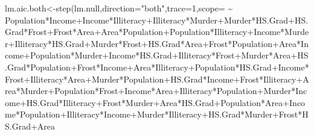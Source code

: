 \documentclass[
]{article}
\newenvironment{Shaded}{\begin{snugshade}}{\end{snugshade}}
\newcommand{\AttributeTok}[1]{\textcolor[rgb]{0.77,0.63,0.00}{#1}}
\newcommand{\DecValTok}[1]{\textcolor[rgb]{0.00,0.00,0.81}{#1}}
\newcommand{\FunctionTok}[1]{\textcolor[rgb]{0.00,0.00,0.00}{#1}}
\newcommand{\NormalTok}[1]{#1}
\newcommand{\OtherTok}[1]{\textcolor[rgb]{0.56,0.35,0.01}{#1}}
\newcommand{\SpecialCharTok}[1]{\textcolor[rgb]{0.00,0.00,0.00}{#1}}
\newcommand{\StringTok}[1]{\textcolor[rgb]{0.31,0.60,0.02}{#1}}
\begin{document}
\begin{Shaded}
\begin{Highlighting}[]
\NormalTok{lm.aic.both}\OtherTok{\textless{}{-}}\FunctionTok{step}\NormalTok{(lm.null,}\AttributeTok{direction=}\StringTok{"both"}\NormalTok{,}\AttributeTok{trace=}\DecValTok{1}\NormalTok{,}\AttributeTok{scope=} \SpecialCharTok{\textasciitilde{}}
\NormalTok{Population}\SpecialCharTok{*}\NormalTok{Income}\SpecialCharTok{+}\NormalTok{Income}\SpecialCharTok{*}\NormalTok{Illiteracy}\SpecialCharTok{+}\NormalTok{Illiteracy}\SpecialCharTok{*}\NormalTok{Murder}\SpecialCharTok{+}\NormalTok{Murder}\SpecialCharTok{*}\NormalTok{HS.Grad}\SpecialCharTok{+}\NormalTok{HS.Grad}\SpecialCharTok{*}\NormalTok{Frost}\SpecialCharTok{+}\NormalTok{Frost}\SpecialCharTok{*}\NormalTok{Area}\SpecialCharTok{+}\NormalTok{Area}\SpecialCharTok{*}\NormalTok{Population}\SpecialCharTok{+}\NormalTok{Population}\SpecialCharTok{*}\NormalTok{Illiteracy}\SpecialCharTok{+}\NormalTok{Income}\SpecialCharTok{*}\NormalTok{Murder}\SpecialCharTok{+}\NormalTok{Illiteracy}\SpecialCharTok{*}\NormalTok{HS.Grad}\SpecialCharTok{+}\NormalTok{Murder}\SpecialCharTok{*}\NormalTok{Frost}\SpecialCharTok{+}\NormalTok{HS.Grad}\SpecialCharTok{*}\NormalTok{Area}\SpecialCharTok{+}\NormalTok{Frost}\SpecialCharTok{*}\NormalTok{Population}\SpecialCharTok{+}\NormalTok{Area}\SpecialCharTok{*}\NormalTok{Income}\SpecialCharTok{+}\NormalTok{Population}\SpecialCharTok{*}\NormalTok{Murder}\SpecialCharTok{+}\NormalTok{Income}\SpecialCharTok{*}\NormalTok{HS.Grad}\SpecialCharTok{+}\NormalTok{Illiteracy}\SpecialCharTok{*}\NormalTok{Frost}\SpecialCharTok{+}\NormalTok{Murder}\SpecialCharTok{*}\NormalTok{Area}\SpecialCharTok{+}\NormalTok{HS.Grad}\SpecialCharTok{*}\NormalTok{Population}\SpecialCharTok{+}\NormalTok{Frost}\SpecialCharTok{*}\NormalTok{Income}\SpecialCharTok{+}\NormalTok{Area}\SpecialCharTok{*}\NormalTok{Illiteracy}\SpecialCharTok{+}\NormalTok{Population}\SpecialCharTok{*}\NormalTok{HS.Grad}\SpecialCharTok{+}\NormalTok{Income}\SpecialCharTok{*}\NormalTok{Frost}\SpecialCharTok{+}\NormalTok{Illiteracy}\SpecialCharTok{*}\NormalTok{Area}\SpecialCharTok{+}\NormalTok{Murder}\SpecialCharTok{*}\NormalTok{Population}\SpecialCharTok{+}\NormalTok{HS.Grad}\SpecialCharTok{*}\NormalTok{Income}\SpecialCharTok{+}\NormalTok{Frost}\SpecialCharTok{*}\NormalTok{Illiteracy}\SpecialCharTok{+}\NormalTok{Area}\SpecialCharTok{*}\NormalTok{Murder}\SpecialCharTok{+}\NormalTok{Population}\SpecialCharTok{*}\NormalTok{Frost}\SpecialCharTok{+}\NormalTok{Income}\SpecialCharTok{*}\NormalTok{Area}\SpecialCharTok{+}\NormalTok{Illiteracy}\SpecialCharTok{*}\NormalTok{Population}\SpecialCharTok{+}\NormalTok{Murder}\SpecialCharTok{*}\NormalTok{Income}\SpecialCharTok{+}\NormalTok{HS.Grad}\SpecialCharTok{*}\NormalTok{Illiteracy}\SpecialCharTok{+}\NormalTok{Frost}\SpecialCharTok{*}\NormalTok{Murder}\SpecialCharTok{+}\NormalTok{Area}\SpecialCharTok{*}\NormalTok{HS.Grad}\SpecialCharTok{+}\NormalTok{Population}\SpecialCharTok{*}\NormalTok{Area}\SpecialCharTok{+}\NormalTok{Income}\SpecialCharTok{*}\NormalTok{Population}\SpecialCharTok{+}\NormalTok{Illiteracy}\SpecialCharTok{*}\NormalTok{Income}\SpecialCharTok{+}\NormalTok{Murder}\SpecialCharTok{*}\NormalTok{Illiteracy}\SpecialCharTok{+}\NormalTok{HS.Grad}\SpecialCharTok{*}\NormalTok{Murder}\SpecialCharTok{+}\NormalTok{Frost}\SpecialCharTok{*}\NormalTok{HS.Grad}\SpecialCharTok{+}\NormalTok{Area}\Special
\end{Highlighting}
\end{Shaded}
\end{document}

